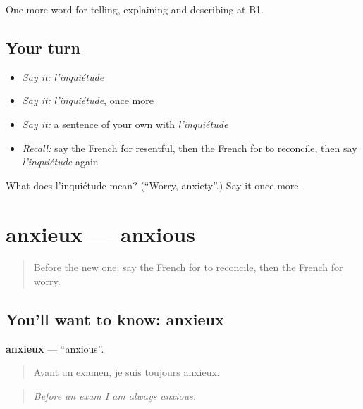 \begin{grammarlens}[title={What you've built}]
One more word for telling, explaining and describing at B1.
\end{grammarlens}

\subsection*{Your turn}
\begin{itemize}
\raggedright
  \item \emph{Say it:} \emph{l'inquiétude}
  \item \emph{Say it:} \emph{l'inquiétude}, once more
  \item \emph{Say it:} a sentence of your own with \emph{l'inquiétude}
  \item \emph{Recall:} say the French for resentful, then the French for to reconcile, then say \emph{l'inquiétude} again
\end{itemize}

\begin{tcolorbox}[breakable,colback=teal!4,colframe=teal!35!black,title={Before you move on}]
What does l'inquiétude mean? (\textquotedblleft{}Worry, anxiety\textquotedblright{}.) Say it once more.
\end{tcolorbox}
\section[anxieux]{anxieux — anxious}

\label{lesson:FR-C476-anxieux}



\begin{quote}
Before the new one: say the French for to reconcile, then the French for worry.
\end{quote}

\subsection*{You'll want to know: anxieux}
\textbf{anxieux} — \textquotedblleft{}anxious\textquotedblright{}.

\begin{quote}
Avant un examen, je suis toujours anxieux.
\end{quote}

\begin{quote}
\emph{Before an exam I am always anxious.}
\end{quote}

